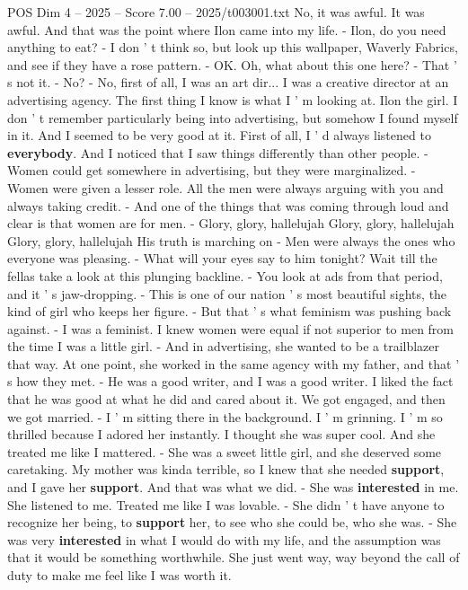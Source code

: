 \begin{textsample}{POS Dim 4 – 2025 – Score 7.00 – 2025/t003001.txt}
No, it was awful.
It was awful.
And that was the point where Ilon came into my life. - Ilon, do you need anything to eat? - I don ' t think so, but look up this wallpaper, Waverly Fabrics, and see if they have a rose pattern. - OK.
Oh, what about this one here? - That ' s not it. - No? - No, first of all, I was an art dir...
I was a creative director at an advertising agency.
The first thing I know is what I ' m looking at.
Ilon the girl.
I don ' t remember particularly being into advertising, but somehow I found myself in it.
And I seemed to be very good at it.
First of all, I ' d always listened to \textbf{everybody}.
And I noticed that I saw things differently than other people. - Women could get somewhere in advertising, but they were marginalized. - Women were given a lesser role.
All the men were always arguing with you and always taking credit. - And one of the things that was coming through loud and clear is that women are for men. - Glory, glory, hallelujah Glory, glory, hallelujah Glory, glory, hallelujah His truth is marching on - Men were always the ones who everyone was pleasing. - What will your eyes say to him tonight?
Wait till the fellas take a look at this plunging backline. - You look at ads from that period, and it ' s jaw-dropping. - This is one of our nation ' s most beautiful sights, the kind of girl who keeps her figure. - But that ' s what feminism was pushing back against. - I was a feminist.
I knew women were equal if not superior to men from the time I was a little girl. - And in advertising, she wanted to be a trailblazer that way.
At one point, she worked in the same agency with my father, and that ' s how they met. - He was a good writer, and I was a good writer.
I liked the fact that he was good at what he did and cared about it.
We got engaged, and then we got married. - I ' m sitting there in the background.
I ' m grinning.
I ' m so thrilled because I adored her instantly.
I thought she was super cool.
And she treated me like I mattered. - She was a sweet little girl, and she deserved some caretaking.
My mother was kinda terrible, so I knew that she needed \textbf{support}, and I gave her \textbf{support}.
And that was what we did. - She was \textbf{interested} in me.
She listened to me.
Treated me like I was lovable. - She didn ' t have anyone to recognize her being, to \textbf{support} her, to see who she could be, who she was. - She was very \textbf{interested} in what I would do with my life, and the assumption was that it would be something worthwhile.
She just went way, way beyond the call of duty to make me feel like I was worth it.

\end{textsample}
